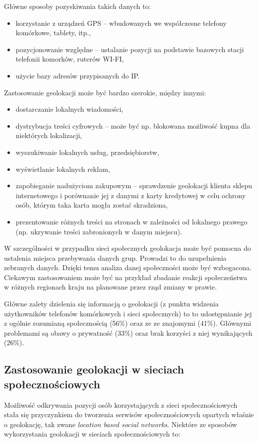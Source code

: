 Główne sposoby pozyskiwania takich danych to:
\begin{itemize}
  \item korzystanie z urządzeń GPS -- wbudowanych we współczesne telefony
komórkowe, tablety, itp.,
  \item pozycjonowanie względne -- ustalanie pozycji na podstawie bazowych stacji
telefonii komorków, ruterów WI-FI,
\item użycie bazy adresów przypisanych do IP.
\end{itemize} 
Zastosowanie geolokacji może być bardzo szerokie, między innymi:
\begin{itemize}
  \item dostarczanie lokalnych wiadomości,
  
  \item dystrybucja treści cyfrowych -- może być np. blokowana możliwość kupna 
  dla niektórych lokalizacji,
  
  \item wyszukiwanie lokalnych usług, przedsiębiorstw,
  
  \item wyświetlanie lokalnych reklam,
  
  \item zapobieganie nadużyciom zakupowym -- sprawdzenie geolokacji
  klienta sklepu internetowego i porównanie jej z danymi z karty kredytowej
  w celu ochrony osób, którym taka karta mogła zostać skradziona,
  
  \item prezentowanie różnych treści na stronach w zależności od lokalnego
  prawego (np. ukrywanie treści zabronionych w danym miejscu).
\end{itemize}
W szczególności w przypadku sieci społecznych geolokacja może być pomocna do
ustalenia miejsca przebywania danych grup. Prowadzi to do uzupełnienia zebranych
danych. Dzięki temu analiza danej społeczności może być wzbogacona.
Ciekawym zastosowaniem może być na przykład zbadanie reakcji społeczeństwa w
różnych regionach kraju na planowane przez rząd zmiany w prawie.

Główne zalety dzielenia się informacją o geolokacji \cite{lostInGeolocation} (z
punktu widzenia użytkowników telefonów komórkowych i sieci społecznych) to
to udostępnianie jej z ogólnie rozumianą społecznością (56\%) oraz ze
ze znajomymi (41\%).
Głównymi problemami są obawy o prywatność (33\%) oraz brak korzyści z niej
wynikających (26\%).


\subsection{Zastosowanie geolokacji w sieciach społecznościowych}
Możliwość odkrywania pozycji osób korzystających z sieci społecznościowych
stała się przyczynkiem do tworzenia serwisów społecznościowych opartych
właśnie o geolokację, tak zwane \textit{location based social networks}.
Niektóre ze sposobów wykorzystania geolokacji w sieciach społecznościowych to:

